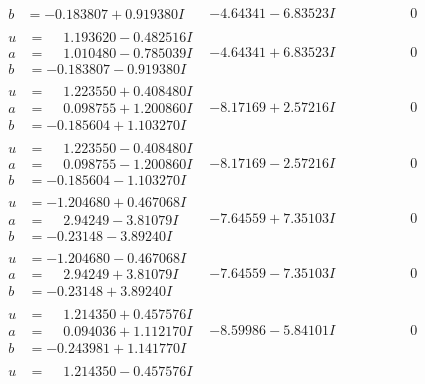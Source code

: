 \documentclass[1p]{elsarticle_modified}
\theoremstyle{definition}
\begin{document}
$$\begin{array}{c|c|c}
\begin{aligned}
b &= -0.183807 + 0.919380 I\end{aligned}
 & -4.64341 - 6.83523 I & \phantom{-0.000000 } 0 \\ \hline\begin{aligned}
u &= \phantom{-}1.193620 - 0.482516 I \\
a &= \phantom{-}1.010480 - 0.785039 I \\
b &= -0.183807 - 0.919380 I\end{aligned}
 & -4.64341 + 6.83523 I & \phantom{-0.000000 } 0 \\ \hline\begin{aligned}
u &= \phantom{-}1.223550 + 0.408480 I \\
a &= \phantom{-}0.098755 + 1.200860 I \\
b &= -0.185604 + 1.103270 I\end{aligned}
 & -8.17169 + 2.57216 I & \phantom{-0.000000 } 0 \\ \hline\begin{aligned}
u &= \phantom{-}1.223550 - 0.408480 I \\
a &= \phantom{-}0.098755 - 1.200860 I \\
b &= -0.185604 - 1.103270 I\end{aligned}
 & -8.17169 - 2.57216 I & \phantom{-0.000000 } 0 \\ \hline\begin{aligned}
u &= -1.204680 + 0.467068 I \\
a &= \phantom{-}2.94249 - 3.81079 I \\
b &= -0.23148 - 3.89240 I\end{aligned}
 & -7.64559 + 7.35103 I & \phantom{-0.000000 } 0 \\ \hline\begin{aligned}
u &= -1.204680 - 0.467068 I \\
a &= \phantom{-}2.94249 + 3.81079 I \\
b &= -0.23148 + 3.89240 I\end{aligned}
 & -7.64559 - 7.35103 I & \phantom{-0.000000 } 0 \\ \hline\begin{aligned}
u &= \phantom{-}1.214350 + 0.457576 I \\
a &= \phantom{-}0.094036 + 1.112170 I \\
b &= -0.243981 + 1.141770 I\end{aligned}
 & -8.59986 - 5.84101 I & \phantom{-0.000000 } 0 \\ \hline\begin{aligned}
u &= \phantom{-}1.214350 - 0.457576 I \\

\end{aligned}
\end{array}$$
\end{document}
